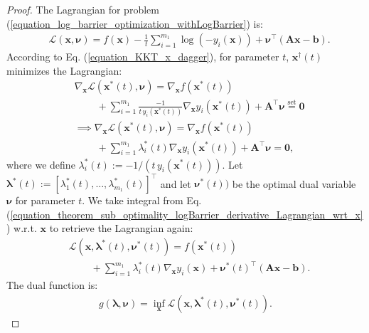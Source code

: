 \documentclass[lang=cn,10pt]{gorgeousnbook}
\numberwithin{equation}{section}%
\numberwithin{figure}{section}%
\begin{document}
\begin{proof}
The Lagrangian for problem (\ref{equation_log_barrier_optimization_withLogBarrier}) is:
\begin{align*}
&\mathcal{L}(\boldsymbol{x}, \boldsymbol{\nu}) = f(\boldsymbol{x}) - \frac{1}{t} \sum_{i=1}^{m_1} \log(-y_i(\boldsymbol{x})) + \boldsymbol{\nu}^\top (\boldsymbol{A} \boldsymbol{x} - \boldsymbol{b}).
\end{align*}
According to Eq. (\ref{equation_KKT_x_dagger}), for parameter $t$, $\boldsymbol{x}^\dagger(t)$ minimizes the Lagrangian:
\begin{align}
&\nabla_{\boldsymbol{x}} \mathcal{L}(\boldsymbol{x}^*(t),\boldsymbol{\nu}) = \nabla_{\boldsymbol{x}} f(\boldsymbol{x}^*(t)) \nonumber\\
&~~~~~~~~~~+ \sum_{i=1}^{m_1} \frac{-1}{t\, y_i(\boldsymbol{x}^*(t))} \nabla_{\boldsymbol{x}} y_i(\boldsymbol{x}^*(t)) + \boldsymbol{A}^\top \boldsymbol{\nu} \overset{\text{set}}{=} \boldsymbol{0} \nonumber\\
&\implies \nabla_{\boldsymbol{x}} \mathcal{L}(\boldsymbol{x}^*(t),\boldsymbol{\nu}) = \nabla_{\boldsymbol{x}} f(\boldsymbol{x}^*(t)) \nonumber\\
&~~~~~~~~~~+ \sum_{i=1}^{m_1} \lambda_i^*(t) \nabla_{\boldsymbol{x}} y_i(\boldsymbol{x}^*(t)) + \boldsymbol{A}^\top \boldsymbol{\nu} = \boldsymbol{0}, \label{equation_theorem_sub_optimality_logBarrier_derivative_Lagrangian_wrt_x}
\end{align}
where we define $\lambda_i^*(t) := -1 / (t\, y_i(\boldsymbol{x}^*(t)))$. Let $\boldsymbol{\lambda}^*(t) := [\lambda_1^*(t), \dots, \lambda_{m_1}^*(t)]^\top$ and let $\boldsymbol{\nu}^*(t))$ be the optimal dual variable $\boldsymbol{\nu}$ for parameter $t$.
We take integral from Eq. (\ref{equation_theorem_sub_optimality_logBarrier_derivative_Lagrangian_wrt_x}) w.r.t. $\boldsymbol{x}$ to retrieve the Lagrangian again:
\begin{align}
&\mathcal{L}(\boldsymbol{x},\boldsymbol{\lambda}^*(t), \boldsymbol{\nu}^*(t)) = f(\boldsymbol{x}^*(t)) \nonumber \\
&~~~~~~~~~~ + \sum_{i=1}^{m_1} \lambda_i^*(t) \nabla_{\boldsymbol{x}} y_i(\boldsymbol{x}) + \boldsymbol{\nu}^*(t)^\top (\boldsymbol{A} \boldsymbol{x} - \boldsymbol{b}). \label{equation_theorem_sub_optimality_logBarrier_Lagrangian}
\end{align}
The dual function is:
\begin{align*}
g(\boldsymbol{\lambda}, \boldsymbol{\nu}) = \inf_{\boldsymbol{x}} \mathcal{L}(\boldsymbol{x},\boldsymbol{\lambda}^*(t), \boldsymbol{\nu}^*(t)).

\end{align*}
\end{proof}
\end{document}
